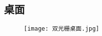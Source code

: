 \documentclass[dvipsnames, svgnames,a4paper,11pt]{article}
\begin{document}

\subsection*{桌面}
\begin{figure}[H]
	\texttt{[image: 双光栅桌面.jpg]}
\end{figure}
\end{document}
